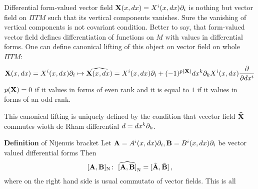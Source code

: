   Differential form-valued vector field  ${\bf X}(x,dx)=X^i(x,dx)\partial_i$ 
is nothing but
 vector field on $\Pi TM$ such that its vertical components
vanishes. Sure the vanishing of vertical components is not
covariant condition.  Better to say, that form-valued vector field
defines differentiation of functions on $M$ with values in differential
forms. One can  define canonical lifting of this object on 
vector field on whole $\Pi TM$:
                 $$
{\bf X}(x,dx)=X^i(x,dx)\partial_i\mapsto \widehat{{\bf X}(x,dx)}=
 X^i(x,dx)\partial_i+(-1)^{p({\bf X})}dx^k\partial_k X^i(x,dx){\partial\over \partial dx^i}
                 $$ 
$p({\bf X})=0$ if it values in forms of even rank and it is equal to $1$
if it values in forms of an odd rank.

 This canonical lifting is uniquely defined by the condition that 
veector field $\widehat {{\bf X}}$ commutes wioth de Rham differential $d=dx^k{\partial_k}$.


  {{\bf Definition} of Nijenuis bracket}
Let ${\bf A}=A^i(x,dx)\partial_i, {\bf B}=B^i(x,dx)\partial_i$ 
be vector valued differential forms
Then
         $$
  [{\bf A},{\bf B}]_{\rm N}\colon\,\,
   \widehat {[{\bf A},{\bf B}]}_{\rm N}=[\hat {{\bf A}},\hat {{\bf B}}]\,,
         $$
where on the right hand side is usual commutato of vector fields.
 This is all\finish
\bye
